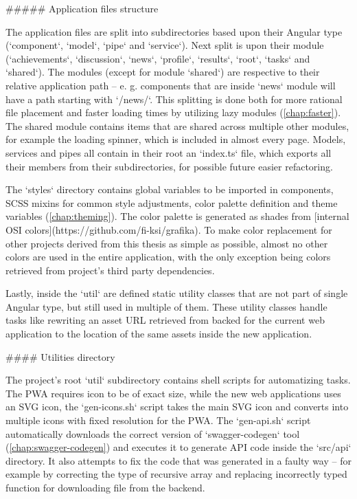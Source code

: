 \documentclass[
  digital, %
  oneside, %
  lof,     %
  lot,     %
]{fithesis4}
\begin{document}
{##### Application files structure

The application files are split into subdirectories based upon their Angular type (`component`, `model`, `pipe` and `service`). Next split is upon their module (`achievements`, `discussion`, `news`, `profile`, `results`, `root`, `tasks` and `shared`). The modules (except for module `shared`) are respective to their relative application path -- e. g. components that are inside `news` module will have a path starting with `/news/`. This splitting is done both for more rational file placement and faster loading times by utilizing lazy modules (\autoref{chap:faster}). The shared module contains items that are shared across multiple other modules, for example the loading spinner, which is included in almost every page. Models, services and pipes all contain in their root an `index.ts` file, which exports all their members from their subdirectories, for possible future easier refactoring.

The `styles` directory contains global variables to be imported in components, SCSS mixins for common style adjustments, color palette definition and theme variables (\autoref{chap:theming}). The color palette is generated as shades from [internal OSI colors](https://github.com/fi-ksi/grafika). To make color replacement for other projects derived from this thesis as simple as possible, almost no other colors are used in the entire application, with the only exception being colors retrieved from project's third party dependencies.

Lastly, inside the `util` are defined static utility classes that are not part of single Angular type, but still used in multiple of them. These utility classes handle tasks like rewriting an asset URL retrieved from backed for the current web application to the location of the same assets inside the new application.

#### Utilities directory
\label{chap:utils}

The project's root `util` subdirectory contains shell scripts for automatizing tasks. The PWA requires icon to be of exact size, while the new web applications uses an SVG icon, the `gen-icons.sh` script takes the main SVG icon and converts into multiple icons with fixed resolution for the PWA. The `gen-api.sh` script automatically downloads the correct version of `swagger-codegen` tool (\autoref{chap:swagger-codegen}) and executes it to generate API code inside the `src/api` directory. It also attempts to fix the code that was generated in a faulty way -- for example by correcting the type of recursive array and replacing incorrectly typed function for downloading file from the backend.

}
\end{document}
